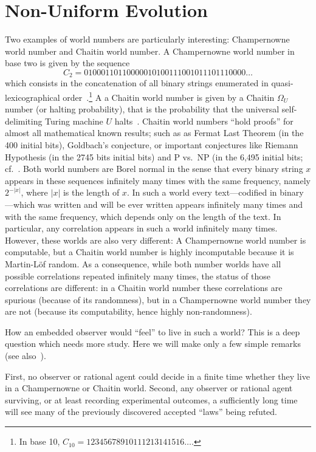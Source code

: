 \documentclass[12pt]{article}
\begin{document}
\section{Non-Uniform Evolution}
\label{2018-was-sectnue}
Two examples of world numbers are particularly interesting:  Champernowne world number and Chaitin world number. A Champernowne world number in base two is given by the sequence $$C_2=01000110110000010100111001011101110000\dots $$ which consists in the concatenation of all binary strings enumerated in quasi-lexicographical order~\cite{DGC1933}.\footnote{In base 10, $C_{10} = 12345678910111213141516\dots$.}  A a Chaitin world number is given by a Chaitin $\Omega_U$ number (or halting probability),  that
is the probability that the universal self-delimiting Turing machine  $U$ halts~\cite{rtx100200236p}.
Chaitin world numbers ``hold proofs'' for almost all mathematical known results;
such as as Fermat Last Theorem  (in the 400 initial bits),
Goldbach's conjecture,
or important conjectures like Riemann Hypothesis  (in the  2745 bits initial bits) and P vs.~NP (in the 6,495 initial bits;
cf.~\cite{CE2013}.
Both
world numbers are Borel normal in the sense that every binary string $x$ appears in these sequences infinitely many times with the same frequency, namely
$2^{-|x|}$, where $|x|$ is the length of $x$.
In such a world every text---codified in binary---which was written and will be ever written appears infinitely many times and with the same frequency,  which depends only on the length of the text. In particular, any correlation appears in such a world infinitely many times. However, these worlds are also very different: A Champernowne world number is computable, but a Chaitin world number is highly incomputable because it is Martin-L\"of random. As a consequence, while both number worlds  have all possible correlations repeated infinitely many times, the status of those correlations are different: in a Chaitin world number these correlations are spurious (because of its randomness), but in a Champernowne world number they are not (because  its  computability, hence highly non-randomness).

How  an embedded observer would  ``feel''  to live in such a world?  This is a deep question which needs  more study. Here we will make only a few simple remarks (see also~\cite{calude1999islawful}).


First, no observer or rational agent could decide in a finite time whether they live in a Champernowne or Chaitin world.
Second, any observer or rational agent surviving, or at least recording experimental outcomes, a sufficiently long time
will see many of the previously discovered accepted ``laws'' being refuted.
\end{document}
